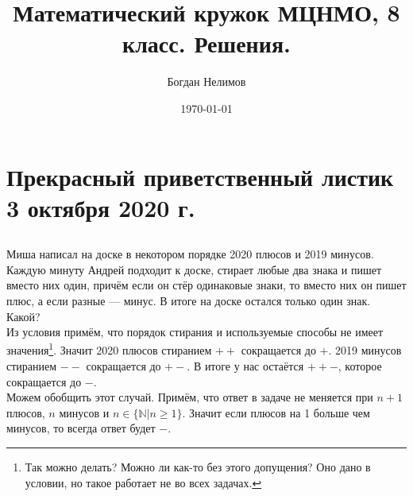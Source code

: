 \documentclass[a4paper,12pt]{article} %
\title{Математический кружок МЦНМО, 8 класс. Решения.}
\author{Богдан Нелимов}
\date{\today}
\begin{document}
	
	\maketitle
	\newpage
	\section{Прекрасный приветственный листик \\3 октября 2020 г.}
	
	
	\subsection{}{Миша написал на доске в некотором порядке 2020 плюсов и 2019 минусов. Каждую минуту Андрей подходит к доске, стирает любые два знака и пишет вместо них один, причём если он стёр одинаковые знаки, то вместо них он пишет плюс, а если разные — минус. В итоге на доске остался только один знак. Какой?\\
		
		Из условия примём, что порядок стирания и используемые способы не имеет значения\footnote{Так можно делать? Можно ли как-то без этого допущения? Оно дано в условии, но такое работает не во всех задачах.}. Значит 2020 плюсов стиранием $++$ сокращается до $+$. 2019 минусов стиранием $--$ сокращается до $+-$. В итоге у нас остаётся $++-$, которое сокращается до $-$. \\ Можем обобщить этот случай. Примём, что ответ в задаче не меняется при $n+1$ плюсов, $n$ минусов и $n\in\{\mathbb N | n \geqslant 1\}$. Значит если плюсов на 1 больше чем минусов, то всегда ответ будет $-$.
	}
\end{document}

